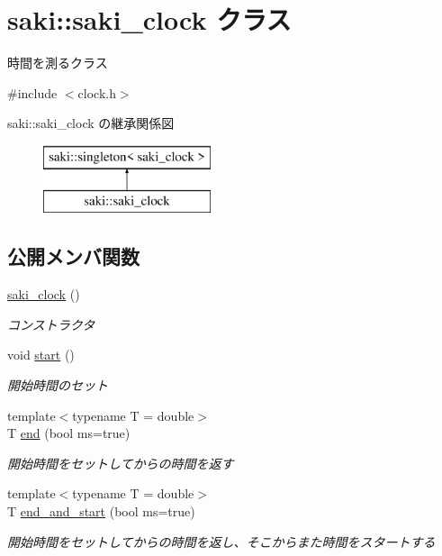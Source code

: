 \hypertarget{classsaki_1_1saki__clock}{}\section{saki\+:\+:saki\+\_\+clock クラス}
\label{classsaki_1_1saki__clock}


時間を測るクラス  




{\ttfamily \#include $<$clock.\+h$>$}

saki\+:\+:saki\+\_\+clock の継承関係図\begin{figure}[H]
\begin{center}
\leavevmode
\includegraphics[height=2.000000cm]{classsaki_1_1saki__clock}
\end{center}
\end{figure}
\subsection*{公開メンバ関数}
\begin{DoxyCompactItemize}
\item 
\mbox{\hyperlink{classsaki_1_1saki__clock_adbee591f08017ecdf70147070df6d778}{saki\+\_\+clock}} ()
\begin{DoxyCompactList}\small\item\em コンストラクタ \end{DoxyCompactList}\item 
void \mbox{\hyperlink{classsaki_1_1saki__clock_a685752d05d2611be4a8d2d2e0eb925c5}{start}} ()
\begin{DoxyCompactList}\small\item\em 開始時間のセット \end{DoxyCompactList}\item 
{\footnotesize template$<$typename T  = double$>$ }\\T \mbox{\hyperlink{classsaki_1_1saki__clock_aa255b4d6478090b4ef19a844dd824d06}{end}} (bool ms=true)
\begin{DoxyCompactList}\small\item\em 開始時間をセットしてからの時間を返す \end{DoxyCompactList}\item 
{\footnotesize template$<$typename T  = double$>$ }\\T \mbox{\hyperlink{classsaki_1_1saki__clock_a6fc6b2cd9a93b18af5583527398842ff}{end\+\_\+and\+\_\+start}} (bool ms=true)
\begin{DoxyCompactList}\small\item\em 開始時間をセットしてからの時間を返し、そこからまた時間をスタートする \end{DoxyCompactList}\end{DoxyCompactItemize}
